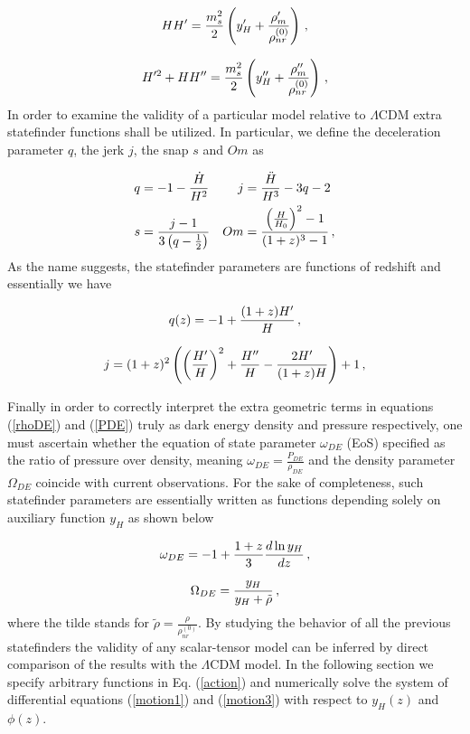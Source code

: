 \documentclass[aps,prd,twocolumn,groupedaddress,showpacs,nofootinbib,amssymb]{revtex4-2}
\begin{document}
\begin{equation}
\centering
\label{H'}
HH'=\frac{m_s^2}{2}\left(y_H'+\frac{\rho_m'}{\rho_{nr}^{(0)}}\right)\, ,
\end{equation}

\begin{equation}
\centering
\label{H''}
H'^2+HH''=\frac{m_s^2}{2}\left(y_H''+\frac{\rho_m''}{\rho_{nr}^{(0)}}\right)\, ,
\end{equation}
In order to examine the validity of a particular model relative to $\Lambda$CDM extra statefinder functions shall be utilized. In particular, we define the deceleration parameter $q$, the jerk $j$, the snap $s$ and $Om$ as 

\begin{align}
\centering
\label{statefinders}
q&=-1-\frac{\dot H}{H^2}&j&=\frac{\ddot H}{H^3}-3q-2\nonumber\\
s&=\frac{j-1}{3\left(q-\frac{1}{2}\right)}&Om&=\frac{\left(\frac{H}{H_0}\right)^2-1}{(1+z)^3-1}\, ,
\end{align}
As the name suggests, the statefinder parameters are functions of redshift and essentially we have



\begin{equation}
\centering
\label{q}
q(z)=-1+\frac{(1+z)H'}{H}\, ,
\end{equation}

\begin{equation}
\centering
\label{j}
j=(1+z)^2\left(\left(\frac{H'}{H}\right)^2+\frac{H''}{H}-\frac{2H'}{(1+z)H}\right)+1\, ,
\end{equation}

Finally in order to correctly interpret the extra geometric terms in equations (\ref{rhoDE}) and (\ref{PDE}) truly as dark energy density and pressure respectively, one must ascertain whether the equation of state parameter $\omega_{DE}$ (EoS) specified as the ratio of pressure over density, meaning $\omega_{DE}=\frac{P_{DE}}{\rho_{DE}}$ and the density parameter $\Omega_{DE}$ coincide with current observations. For the sake of completeness, such statefinder parameters are essentially written as functions depending solely on auxiliary function $y_H$ as shown below

\begin{equation}
\centering
\label{omega}
\omega_{DE}=-1+\frac{1+z}{3}\frac{d\ln y_H}{dz}\, ,
\end{equation} 

\begin{equation}
\centering
\label{Omega}
\Omega_{DE}=\frac{y_H}{y_H+\tilde\rho}\, ,
\end{equation}
where the tilde stands for $\tilde\rho=\frac{\rho}{\rho_{nr}^{(0)}}$. By studying the behavior of all the previous statefinders the validity of any scalar-tensor model can be inferred by direct comparison of the results with the $\Lambda$CDM model. In the following section we specify arbitrary functions in Eq. (\ref{action}) and numerically solve the system of differential equations (\ref{motion1}) and (\ref{motion3}) with respect to $y_H(z)$ and $\phi(z)$.
\end{document}
